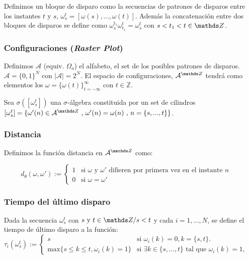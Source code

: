 Definimos un bloque de disparo como la secuencias de patrones de disparos entre los instantes $t$ y $s$, $\omega_s^t=[\omega(s),...,\omega(t)]$. Además la concatenación entre dos bloques de disparos se define como $\omega_s^{t_1}\omega_{t_1}^t=\omega_s^t$ con $s<t_1<t \in \enteros$.

\subsubsection{Configuraciones (\emph{Raster Plot})}

Definimos $\mathcal{A}$ (equiv. $\Omega_o$) el alfabeto, el set de los posibles patrones de disparos. $\mathcal{A}=\{0,1\}^N$ con $|\mathcal{A}|=2^N$. El espacio de configuraciones, $\mathcal{A}^{\enteros}$ tendrá como elementos los $\omega=\{\omega(t)\}^\infty_{t=-\infty}$ con $t \in \mathbb{Z}$. 

Sea $\sigma([\omega_s^t])$ una $\sigma$-álgebra constituida por un set de cilindros $[\omega_s^t]=\{ \omega'(n) \in \mathcal{A}^{\enteros} \text{ , } \omega'(n)=\omega(n) \text{ , } n=\{s,...,t\} \}$.   


\subsubsection{Distancia}
Definimos la función distancia en $\mathcal{A}^{\enteros}$ como:

\begin{equation}
    d_{\theta}(\omega,\omega') := \left\{ \begin{array}{ll}
        1 & \text{si } \omega \text{ y } \omega' \text{ difieren por primera vez en el instante } n\\
        0  & \text{si } \omega=\omega'
    \end{array}\right.
    \label{eqn:distancia}
\end{equation}

\subsubsection{Tiempo del último disparo}
Dada la secuencia $\omega_s^t$ con $s \text{ y } t \in \enteros / s<t$ y cada $i=1,...,N$, se define el tiempo de último disparo a la función:
\begin{equation}
    \tau_i(\omega_s^t) := \left\{ \begin{array}{ll}
        s   & \text{si  } \omega_i(k)=0, k=\{s,t\}. \\ 
        \text{max}\{s \leq k \leq t, \omega_i(k)=1\} & \text{si  } \exists k \in \{s,...,t\} \text{ tal que }\omega_i(k)=1,
    \end{array}\right.
    \label{eqn:ultimoDisparo}
\end{equation}


